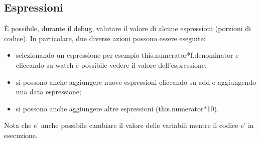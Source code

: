 \documentclass{article}
\begin{document}
\subsection{Espressioni}
\`E possibile, durante il debug, valutare il valore di alcune espressioni (porzioni di codice). In particolare, due diverse azioni possono essere eseguite:

\begin{itemize}
\item selezionando un espressione per esempio this.numerator*f.denominator e cliccando su watch \`e possibile vedere  il valore dell'espressione;
\item si possono anche aggiungere nuove espressioni cliccando su add e aggiungendo una data espressione;
\item si possono anche aggiungere altre espressioni (this.numerator*10).
\end{itemize}

 Nota che e' anche possibile cambiare il valore delle variabili mentre il codice e' in esecuzione.
\end{document}
